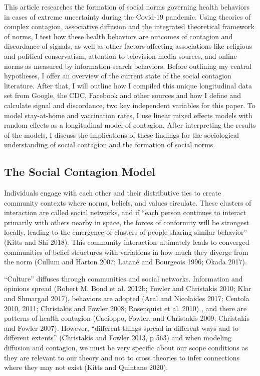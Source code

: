 This article researches the formation of social norms governing health behaviors
in cases of extreme uncertainty during the Covid-19 pandemic. Using theories of complex
contagion, associative diffusion and the integrated theoretical framework of
norms, I test how these health behaviors are outcomes of contagion and
discordance of signals, as well as other factors affecting associations like
religious and political conservatism, attention to television media sources,
and online norms as measured by information-search behaviors. Before outlining
my central hypotheses, I offer an overview of the current state of the social
contagion literature. After that, I will outline how I compiled this unique
longitudinal data set from Google, the CDC, Facebook and other sources and how I
define and calculate signal and discordance, two key independent variables for
this paper. To model stay-at-home and vaccination rates, I use linear mixed effects
models with random effects as a longitudinal model of contagion. After
interpreting the results of the models, I discuss the implications of these
findings for the sociological understanding of social contagion and the
formation of social norms.

\hypertarget{the-social-contagion-model}{%
\subsection{The Social Contagion Model}\label{the-social-contagion-model}}

Individuals engage with each other and their distributive ties to create
community contexts where norms, beliefs, and values circulate. These clusters of
interaction are called social networks, and if ``each person continues to
interact primarily with others nearby in space, the forces of conformity will be
strongest locally, leading to the emergence of clusters of people sharing
similar behavior'' (Kitts and Shi 2018). This community
interaction ultimately leads to converged communities of belief structures with
variations in how much they diverge from the norm (Cullum and Harton 2007; Latané and Bourgeois 1996; Okada 2017).

``Culture'' diffuses through communities and social networks. Information and
opinions spread (Robert M. Bond et al. 2012b; Fowler and Christakis 2010; Klar and Shmargad 2017), behaviors are adopted
(Aral and Nicolaides 2017; Centola 2010, 2011; Christakis and Fowler 2008; Rosenquist et al. 2010) , and there are patterns of health
contagion (Cacioppo, Fowler, and Christakis 2009; Christakis and Fowler 2007). However,
``different things spread in different ways and to different extents''
(Christakis and Fowler 2013, p 563) and when modeling diffusion and
contagion, we must be very specific about our scope conditions as they are
relevant to our theory and not to cross theories to infer connections where they
may not exist (Kitts and Quintane 2020).

